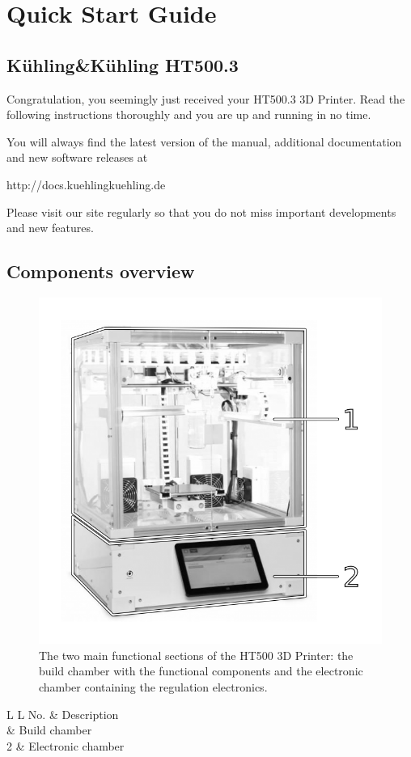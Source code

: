 \section*{Quick Start Guide}

\subsection*{Kühling\&Kühling HT500.3}

 Congratulation, you seemingly just received your HT500.3 3D Printer. Read the following instructions thoroughly and you are up and running in no time.

You will always find the latest version of the manual, additional documentation and new software releases at

http://docs.kuehlingkuehling.de

Please visit our site regularly so that you do not miss important developments and new features. 


\subsection*{Components overview}

\begin{figure}[H]
  \centering
  \includegraphics[width=.7\linewidth]{./img/qsg_overview_1.png}
  \caption{The two main functional sections of the HT500 3D Printer: the build 
           chamber with the functional components and the electronic chamber containing the regulation electronics.}
\end{figure}

\begin{table}[H]
  \centering
  \begin{tabulary}{\textwidth}{ L L }
    \toprule
    No. &   Description         \\
     	&   Build chamber       \\
    2 	&   Electronic chamber  \\
    \bottomrule
  \end{tabulary}
\end{table}


